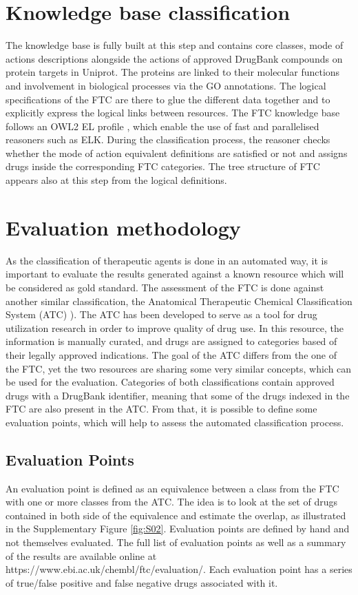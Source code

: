 \documentclass{bioinfo}
\begin{document}
\section{Knowledge base classification}
The knowledge base is fully built at this step and contains core classes, mode 
of actions descriptions alongside the actions of approved DrugBank compounds on 
protein targets in Uniprot. The proteins are linked to their molecular functions and involvement in 
biological processes via the GO annotations. The logical specifications of the FTC are there to glue 
the different data together and to explicitly express the logical links between resources. The FTC 
knowledge base follows an OWL2 EL profile \citep{Motik2009}, which enable the use of fast and parallelised reasoners such 
as ELK. During the classification process, the reasoner checks whether the mode of action equivalent 
definitions are satisfied or not and assigns drugs inside the corresponding FTC categories. The tree structure 
of FTC appears also at this step from the logical definitions.

\section{Evaluation methodology}
As the classification of therapeutic agents is done in an automated way, it 
is important to evaluate the results generated against a known resource which will be 
considered as gold standard. The assessment of the FTC is done against another similar 
classification, the Anatomical Therapeutic Chemical Classification System (ATC) \citep{world2000anatomical}). 
The ATC has been developed to serve as a tool for drug utilization research in order to 
improve quality of drug use. In this resource, the information is manually curated, and drugs 
are assigned to categories based of their legally approved indications. The goal of the ATC differs 
from the one of the FTC, yet the two resources are sharing some very similar concepts, which can be 
used for the evaluation. Categories of both classifications contain approved drugs with a DrugBank 
identifier, meaning that some of the drugs indexed in the FTC are also present in the ATC. From that, 
it is possible to define some evaluation points, which will help to assess the automated classification process.

\subsection{Evaluation Points}
An evaluation point is defined as an equivalence between a class from the FTC with one or 
more classes from the ATC. The idea is to look at the set of drugs contained in both side of the 
equivalence and estimate the overlap, as illustrated in the Supplementary Figure \ref{fig:S02}. Evaluation points are defined 
by hand and not themselves evaluated. The full list of evaluation points as well as a summary of the results 
are available online at https://www.ebi.ac.uk/chembl/ftc/evaluation/. Each evaluation point has a series of 
true/false positive and false negative drugs associated with it.
 
\end{document}
